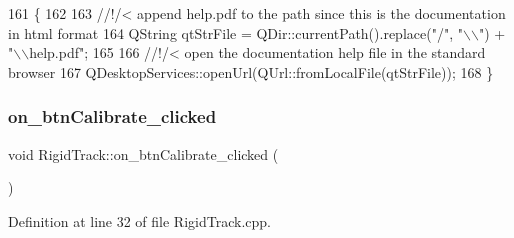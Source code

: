 \begin{DoxyCode}
161 \{
162     \textcolor{comment}{}
163 \textcolor{comment}{    //!/< append help.pdf to the path since this is the documentation in html format}
164 \textcolor{comment}{}    QString qtStrFile = QDir::currentPath().replace(\textcolor{stringliteral}{"/"}, \textcolor{stringliteral}{"\(\backslash\)\(\backslash\)"}) + \textcolor{stringliteral}{"\(\backslash\)\(\backslash\)help.pdf"};
165 \textcolor{comment}{}
166 \textcolor{comment}{    //!/< open the documentation help file in the standard browser}
167 \textcolor{comment}{}    QDesktopServices::openUrl(QUrl::fromLocalFile(qtStrFile));
168 \}
\end{DoxyCode}
\mbox{\label{class_rigid_track_aed2c39da404909142074f7dd2ce75a63}} 
\subsubsection{\texorpdfstring{on\+\_\+btn\+Calibrate\+\_\+clicked}{on\_btnCalibrate\_clicked}}
{\footnotesize\ttfamily void Rigid\+Track\+::on\+\_\+btn\+Calibrate\+\_\+clicked (\begin{DoxyParamCaption}{ }\end{DoxyParamCaption})\hspace{0.3cm}{\ttfamily [slot]}}



Definition at line 32 of file Rigid\+Track.\+cpp.



